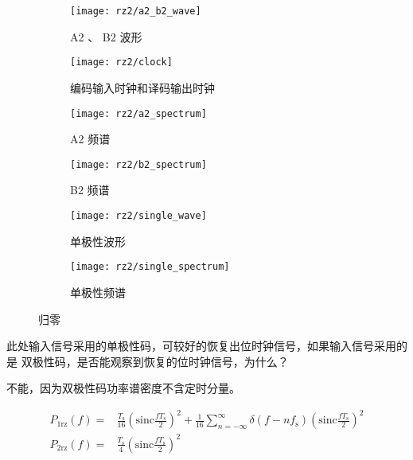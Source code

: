 \documentclass[../main]{subfiles}
\begin{document}
\begin{figure}[htbp]
  \centering
  \begin{subfigure}[htbp]{0.45\linewidth}
    \centering
    \texttt{[image: rz2/a2\_b2\_wave]}
    \caption{A2 、 B2 波形}%
    \label{fig:rz2/a2_b2_wave}
  \end{subfigure}
  \quad
  \begin{subfigure}[htbp]{0.45\linewidth}
    \centering
    \texttt{[image: rz2/clock]}
    \caption{编码输入时钟和译码输出时钟}%
    \label{fig:rz2/clock}
  \end{subfigure}

  \begin{subfigure}[htbp]{0.45\linewidth}
    \centering
    \texttt{[image: rz2/a2\_spectrum]}
    \caption{A2 频谱}%
    \label{fig:rz2/a2_spectrum}
  \end{subfigure}
  \quad
  \begin{subfigure}[htbp]{0.45\linewidth}
    \centering
    \texttt{[image: rz2/b2\_spectrum]}
    \caption{B2 频谱}%
    \label{fig:rz2/b2_spectrum}
  \end{subfigure}

  \begin{subfigure}[htbp]{0.45\linewidth}
    \centering
    \texttt{[image: rz2/single\_wave]}
    \caption{单极性波形}%
    \label{fig:rz2/single_wave}
  \end{subfigure}
  \quad
  \begin{subfigure}[htbp]{0.45\linewidth}
    \centering
    \texttt{[image: rz2/single\_spectrum]}
    \caption{单极性频谱}%
    \label{fig:rz2/single_spectrum}
  \end{subfigure}
  \caption{归零}%
  \label{fig:rz2}
\end{figure}

\begin{Exercise}[title = 思考]
  此处输入信号采用的单极性码，可较好的恢复出位时钟信号，如果输入信号采用的是
  双极性码，是否能观察到恢复的位时钟信号，为什么？
\end{Exercise}

\begin{Answer}
  不能，因为双极性码功率谱密度不含定时分量。
\end{Answer}

\begin{align}
  P_{1\mathrm{rz}}(f) = &
  \frac{T_\mathrm{s}}{16}{\left(\mathrm{sinc}\frac{fT_\mathrm{s}}{2}\right)}^2
  + \frac{1}{16} \sum^\infty_{n = -\infty} \delta(f -
  nf_\mathrm{s}){\left(\mathrm{sinc}\frac{fT_\mathrm{s}}{2}\right)}^2\\
  P_{2\mathrm{rz}}(f) = &
  \frac{T_\mathrm{s}}{4}{\left(\mathrm{sinc}\frac{fT_\mathrm{s}}{2}\right)}^2
\end{align}
\end{document}
